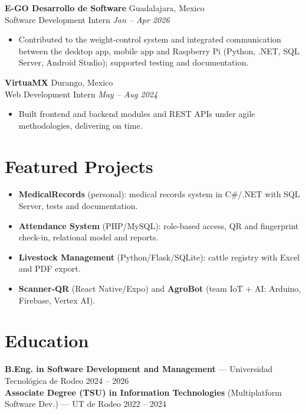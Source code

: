 \documentclass[10pt,a4paper]{article}
\newcommand{\entry}[4]{%
  \textbf{#1} \hfill {\color{muted}\small #2}\\[0pt]
  {\color{accent}\small #3} \hfill {\color{muted}\itshape\small #4}\\[1pt]
}
\begin{document}
\entry{E-GO Desarrollo de Software}{Guadalajara, Mexico}{Software Development Intern}{Jan -- Apr 2026}
\begin{itemize}
  \item Contributed to the weight-control system and integrated communication between the desktop app, mobile app and Raspberry Pi (Python, .NET, SQL Server, Android Studio); supported testing and documentation.
\end{itemize}

\entry{VirtuaMX}{Durango, Mexico}{Web Development Intern}{May -- Aug 2024}
\begin{itemize}
  \item Built frontend and backend modules and REST APIs under agile methodologies, delivering on time.
\end{itemize}

\section{Featured Projects}
\begin{itemize}
  \item \textbf{MedicalRecords} (personal): medical records system in C\#/.NET with SQL Server, tests and documentation.
  \item \textbf{Attendance System} (PHP/MySQL): role-based access, QR and fingerprint check-in, relational model and reports.
  \item \textbf{Livestock Management} (Python/Flask/SQLite): cattle registry with Excel and PDF export.
  \item \textbf{Scanner-QR} (React Native/Expo) and \textbf{AgroBot} (team IoT + AI: Arduino, Firebase, Vertex AI).
\end{itemize}

\section{Education}
\textbf{B.Eng. in Software Development and Management} --- Universidad Tecnológica de Rodeo \hfill {\color{muted}\small 2024 -- 2026}\\[1pt]
\textbf{Associate Degree (TSU) in Information Technologies} (Multiplatform Software Dev.) --- UT de Rodeo \hfill {\color{muted}\small 2022 -- 2024}

\end{document}
